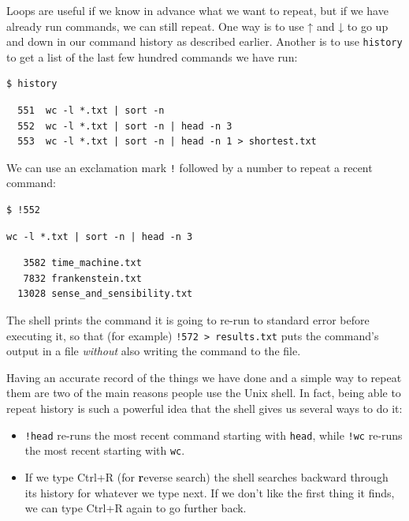 \documentclass[
]{krantz}
\providecommand{\tightlist}{%
  \setlength{\itemsep}{0pt}\setlength{\parskip}{0pt}}
\begin{document}
Loops are useful if we know in advance what we want to repeat,
but if we have already run commands,
we can still repeat.
One way is to use ↑ and ↓
to go up and down in our command history as described earlier.
Another is to use \texttt{history}
to get a list of the last few hundred commands we have run:

\begin{verbatim}
$ history
\end{verbatim}

\begin{verbatim}
  551  wc -l *.txt | sort -n
  552  wc -l *.txt | sort -n | head -n 3
  553  wc -l *.txt | sort -n | head -n 1 > shortest.txt
\end{verbatim}

We can use an exclamation mark \texttt{!} followed by a number
to repeat a recent command:

\begin{verbatim}
$ !552
\end{verbatim}

\begin{verbatim}
wc -l *.txt | sort -n | head -n 3
\end{verbatim}

\begin{verbatim}
   3582 time_machine.txt
   7832 frankenstein.txt
  13028 sense_and_sensibility.txt
\end{verbatim}

The shell prints the command it is going to re-run to standard error
before executing it,
so that (for example) \texttt{!572~\textgreater{}~results.txt}
puts the command's output in a file
\emph{without} also writing the command to the file.

Having an accurate record of the things we have done
and a simple way to repeat them
are two of the main reasons people use the Unix shell.
In fact,
being able to repeat history is such a powerful idea
that the shell gives us several ways to do it:

\begin{itemize}
\tightlist
\item
  \texttt{!head} re-runs the most recent command starting with \texttt{head},
  while \texttt{!wc} re-runs the most recent starting with \texttt{wc}.
\item
  If we type Ctrl+R (for \textbf{r}everse search)
  the shell searches backward through its history for whatever we type next.
  If we don't like the first thing it finds,
  we can type Ctrl+R again to go further back.
\end{itemize}
\end{document}
